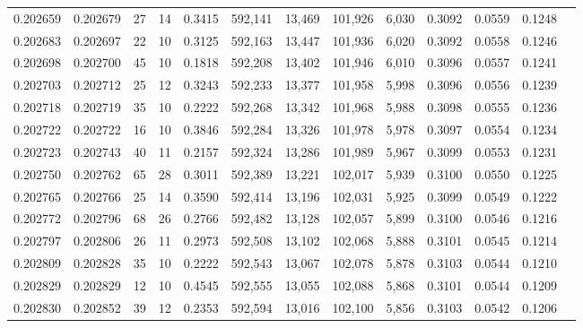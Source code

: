 \begin{tabular}{rrrrrrrrrrrrr}
0.202659 & 0.202679 &    27 &  14 &                                     0.3415 & 592,141 &  13,469 & 101,926 &   6,030 & 0.3092 & 0.0559 & 0.1248 \\
0.202683 & 0.202697 &    22 &  10 &                                     0.3125 & 592,163 &  13,447 & 101,936 &   6,020 & 0.3092 & 0.0558 & 0.1246 \\
0.202698 & 0.202700 &    45 &  10 &                                     0.1818 & 592,208 &  13,402 & 101,946 &   6,010 & 0.3096 & 0.0557 & 0.1241 \\
0.202703 & 0.202712 &    25 &  12 &                                     0.3243 & 592,233 &  13,377 & 101,958 &   5,998 & 0.3096 & 0.0556 & 0.1239 \\
0.202718 & 0.202719 &    35 &  10 &                                     0.2222 & 592,268 &  13,342 & 101,968 &   5,988 & 0.3098 & 0.0555 & 0.1236 \\
0.202722 & 0.202722 &    16 &  10 &                                     0.3846 & 592,284 &  13,326 & 101,978 &   5,978 & 0.3097 & 0.0554 & 0.1234 \\
0.202723 & 0.202743 &    40 &  11 &                                     0.2157 & 592,324 &  13,286 & 101,989 &   5,967 & 0.3099 & 0.0553 & 0.1231 \\
0.202750 & 0.202762 &    65 &  28 &                                     0.3011 & 592,389 &  13,221 & 102,017 &   5,939 & 0.3100 & 0.0550 & 0.1225 \\
0.202765 & 0.202766 &    25 &  14 &                                     0.3590 & 592,414 &  13,196 & 102,031 &   5,925 & 0.3099 & 0.0549 & 0.1222 \\
0.202772 & 0.202796 &    68 &  26 &                                     0.2766 & 592,482 &  13,128 & 102,057 &   5,899 & 0.3100 & 0.0546 & 0.1216 \\
0.202797 & 0.202806 &    26 &  11 &                                     0.2973 & 592,508 &  13,102 & 102,068 &   5,888 & 0.3101 & 0.0545 & 0.1214 \\
0.202809 & 0.202828 &    35 &  10 &                                     0.2222 & 592,543 &  13,067 & 102,078 &   5,878 & 0.3103 & 0.0544 & 0.1210 \\
0.202829 & 0.202829 &    12 &  10 &                                     0.4545 & 592,555 &  13,055 & 102,088 &   5,868 & 0.3101 & 0.0544 & 0.1209 \\
0.202830 & 0.202852 &    39 &  12 &                                     0.2353 & 592,594 &  13,016 & 102,100 &   5,856 & 0.3103 & 0.0542 & 0.1206 \\

\end{tabular}
